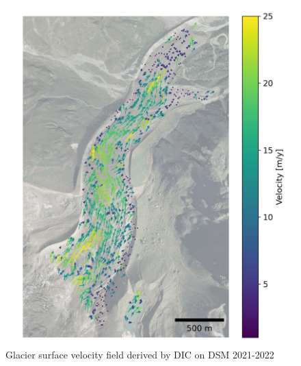 \begin{figure}
    \centering
    \includegraphics[height=\textheight]{figures/chapter3/velocity_DIC_2021-2022.png}
    \caption{Glacier surface velocity field derived by DIC on DSM 2021-2022}
\end{figure}

